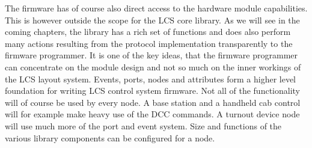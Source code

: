 \begin{center}
\end{center}
\FloatBarrier

The firmware has of course also direct access to the hardware module capabilities. This is however outside the scope for the LCS core library. As we will see in the coming chapters, the library has a rich set of functions and does also perform many actions resulting from the protocol implementation transparently to the firmware programmer. It is one of the key ideas, that the firmware programmer can concentrate on the module design and not so much on the inner workings of the LCS layout system. Events, ports, nodes and attributes form a higher level foundation for writing LCS control system firmware. Not all of the functionality will of course be used by every node. A base station and a handheld cab control will for example make heavy use of the DCC commands. A turnout device node will use much more of the port and event system. Size and functions of the various library components can be configured for a node.

